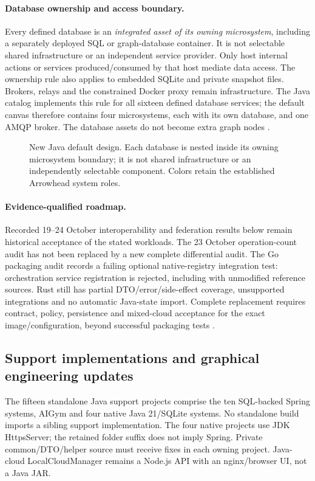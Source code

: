 \documentclass[a4paper]{arrowhead}
\begin{document}
\paragraph{Database ownership and access boundary.}
Every defined database is an \emph{integrated asset of its owning microsystem},
including a separately deployed SQL or graph-database container. It is not
selectable shared infrastructure or an independent service provider. Only host
internal actions or services produced/consumed by that host mediate data access.
The ownership rule also applies to embedded SQLite and private snapshot files.
Brokers, relays and the constrained Docker proxy remain infrastructure. The
Java catalog implements this rule for all sixteen defined database services;
the default canvas therefore contains four microsystems, each with its own
database, and one AMQP broker. The database assets do not become extra graph
nodes \cite{javaDatabaseAssets20261030}.

\begin{figure}[htbp]
\centering

\caption{New Java default design. Each database is nested inside its owning
microsystem boundary; it is not shared infrastructure or an independently
selectable component. Colors retain the established Arrowhead system roles.}
\label{fig:default-owned-assets}
\end{figure}
\FloatBarrier

\paragraph{Evidence-qualified roadmap.}
Recorded 19--24 October interoperability and federation results below remain
historical acceptance of the stated workloads. The 23 October operation-count
audit has not been replaced by a new complete differential audit. The Go
packaging audit records a failing optional native-registry integration test:
orchestration service registration is rejected, including with unmodified
reference sources. Rust still has partial DTO/error/side-effect coverage,
unsupported integrations and no automatic Java-state import. Complete
replacement requires contract, policy, persistence and mixed-cloud acceptance
for the exact image/configuration, beyond successful packaging tests
\cite{goPackaging20261028,rustPackaging20261028,nativeCompatibility20261024}.

\subsection{Support implementations and graphical engineering updates}
\label{sec:support-engineering-update}
The fifteen standalone Java support projects comprise the ten SQL-backed Spring
systems, AIGym and four native Java 21/SQLite systems. No standalone build imports
a sibling support implementation. The four native projects use JDK HttpsServer;
the retained  folder suffix does not imply Spring. Private
common/DTO/helper source must receive fixes in each owning project. Java-cloud
LocalCloudManager remains a Node.js API with an nginx/browser UI, not a Java JAR.
\end{document}
